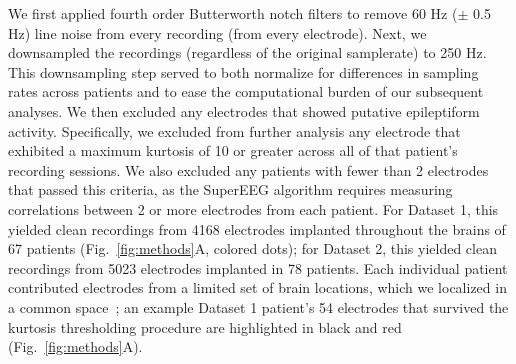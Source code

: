 \documentclass[11pt]{article}
\begin{document}
We first applied fourth order Butterworth notch filters to remove 60 Hz ($\pm$
0.5 Hz) line noise from every recording (from every electrode). Next, we
downsampled the recordings (regardless of the original samplerate) to 250 Hz.
This downsampling step served to both normalize for differences in sampling
rates across patients and to ease the computational burden of our subsequent
analyses.  We then excluded any electrodes that showed putative epileptiform
activity. Specifically, we excluded from further analysis any electrode that
exhibited a maximum kurtosis of 10 or greater across all of that patient's
recording sessions.  We also excluded any patients with fewer than 2 electrodes
that passed this criteria, as the SuperEEG algorithm requires measuring
correlations between 2 or more electrodes from each patient.  For Dataset 1,
this yielded clean recordings from 4168 electrodes implanted throughout the
brains of 67 patients (Fig.~\ref{fig:methods}A, colored dots); for Dataset 2,
this yielded clean recordings from 5023 electrodes implanted in 78 patients.
Each individual patient contributed electrodes from a limited set of brain
locations, which we localized in a common space~\citep[MNI152;][]{GrabEtal06};
an example Dataset 1 patient's 54 electrodes that survived the kurtosis
thresholding procedure are highlighted in black and red
(Fig.~\ref{fig:methods}A).
\end{document}
